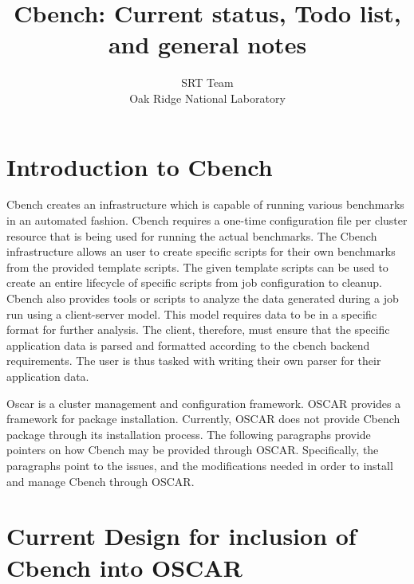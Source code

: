 \documentclass[pdftex,10pt]{article}
\title{Cbench: Current status, Todo list, and general notes}
\author{SRT Team \\
	Oak Ridge National Laboratory 
}
\begin{document}
\maketitle
\renewcommand{\thefootnote}{\arabic{footnote}}

\section{Introduction to Cbench}
\label{sect:Introduction}

Cbench creates an infrastructure which is capable of running various benchmarks in an automated fashion. Cbench requires a one-time configuration file per cluster resource that is being used for running the actual benchmarks. The Cbench infrastructure allows an user to create specific scripts for their own benchmarks from the provided template scripts. The given template scripts can be used to create an entire lifecycle of specific scripts from job configuration to cleanup. Cbench also provides tools or scripts to analyze the data generated during a job run using a client-server model. This model requires data to be in a specific format for further analysis. The client, therefore, must ensure that the specific application data is parsed and formatted according to the cbench backend requirements. The user is thus tasked with writing their own parser for their application data.

Oscar is a cluster management and configuration framework. OSCAR provides a framework for package installation. Currently, OSCAR does not provide Cbench package through its installation process. The following paragraphs provide pointers on how Cbench may be provided through OSCAR. Specifically, the paragraphs point to the issues, and the modifications needed in order to install and manage Cbench through OSCAR.

\section{Current Design for inclusion of Cbench into OSCAR}
\end{document}

